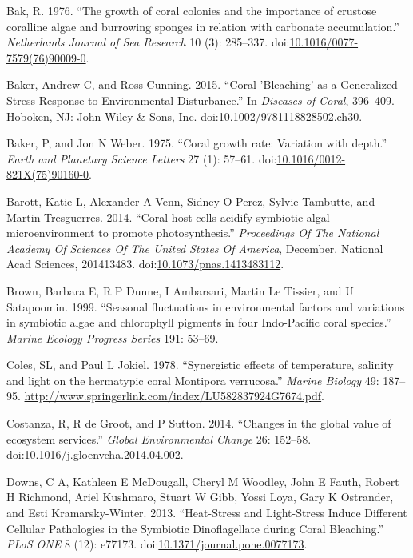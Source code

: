 \documentclass[]{elsarticle} %
\begin{document}
\hypertarget{ref-Bak:1976bv}{}
Bak, R. 1976. ``The growth of coral colonies and the importance of
crustose coralline algae and burrowing sponges in relation with
carbonate accumulation.'' \emph{Netherlands Journal of Sea Research} 10
(3): 285--337.
doi:\href{https://doi.org/10.1016/0077-7579(76)90009-0}{10.1016/0077-7579(76)90009-0}.

\hypertarget{ref-Baker:2015kp}{}
Baker, Andrew C, and Ross Cunning. 2015. ``Coral 'Bleaching' as a
Generalized Stress Response to Environmental Disturbance.'' In
\emph{Diseases of Coral}, 396--409. Hoboken, NJ: John Wiley \& Sons,
Inc.
doi:\href{https://doi.org/10.1002/9781118828502.ch30}{10.1002/9781118828502.ch30}.

\hypertarget{ref-Baker:1975ip}{}
Baker, P, and Jon N Weber. 1975. ``Coral growth rate: Variation with
depth.'' \emph{Earth and Planetary Science Letters} 27 (1): 57--61.
doi:\href{https://doi.org/10.1016/0012-821X(75)90160-0}{10.1016/0012-821X(75)90160-0}.

\hypertarget{ref-Barott:2014gx}{}
Barott, Katie L, Alexander A Venn, Sidney O Perez, Sylvie Tambutte, and
Martin Tresguerres. 2014. ``Coral host cells acidify symbiotic algal
microenvironment to promote photosynthesis.'' \emph{Proceedings Of The
National Academy Of Sciences Of The United States Of America}, December.
National Acad Sciences, 201413483.
doi:\href{https://doi.org/10.1073/pnas.1413483112}{10.1073/pnas.1413483112}.

\hypertarget{ref-Brown:1999p3534}{}
Brown, Barbara E, R P Dunne, I Ambarsari, Martin Le Tissier, and U
Satapoomin. 1999. ``Seasonal fluctuations in environmental factors and
variations in symbiotic algae and chlorophyll pigments in four
Indo-Pacific coral species.'' \emph{Marine Ecology Progress Series} 191:
53--69.

\hypertarget{ref-Coles:1978p1124}{}
Coles, SL, and Paul L Jokiel. 1978. ``Synergistic effects of
temperature, salinity and light on the hermatypic coral Montipora
verrucosa.'' \emph{Marine Biology} 49: 187--95.
\url{http://www.springerlink.com/index/LU582837924G7674.pdf}.

\hypertarget{ref-Costanza:2014ex}{}
Costanza, R, R de Groot, and P Sutton. 2014. ``Changes in the global
value of ecosystem services.'' \emph{Global Environmental Change} 26:
152--58.
doi:\href{https://doi.org/10.1016/j.gloenvcha.2014.04.002}{10.1016/j.gloenvcha.2014.04.002}.

\hypertarget{ref-Downs:2013kc}{}
Downs, C A, Kathleen E McDougall, Cheryl M Woodley, John E Fauth, Robert
H Richmond, Ariel Kushmaro, Stuart W Gibb, Yossi Loya, Gary K Ostrander,
and Esti Kramarsky-Winter. 2013. ``Heat-Stress and Light-Stress Induce
Different Cellular Pathologies in the Symbiotic Dinoflagellate during
Coral Bleaching.'' \emph{PLoS ONE} 8 (12): e77173.
doi:\href{https://doi.org/10.1371/journal.pone.0077173}{10.1371/journal.pone.0077173}.
\end{document}
